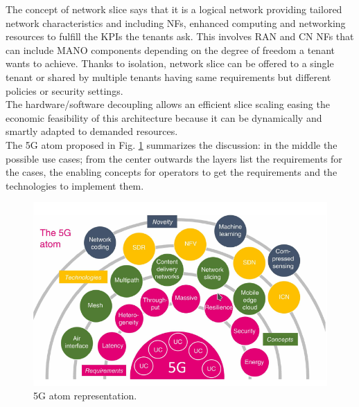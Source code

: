 \documentclass[a4paper,12pt]{report} %
\begin{document}
The concept of network slice says that it is a logical network providing tailored network characteristics and including NFs, enhanced computing and networking resources to fulfill the
KPIs the tenants ask. This involves \gls{RAN} and CN NFs that can include MANO components depending on the degree of freedom a tenant wants to achieve. Thanks to isolation, network slice can be offered to a
single tenant or shared by multiple tenants having same requirements
but different policies or security settings. \\
The hardware/software decoupling allows an efficient slice scaling easing the
economic feasibility of this architecture because it can be dynamically and smartly adapted to demanded resources.\\
The 5G atom proposed in Fig. \ref{atom} summarizes the discussion: in the middle the possible use cases; from the center outwards the layers list the requirements for the cases, the enabling concepts for
operators to get the requirements and the technologies to implement them. \cite{al20185g} \cite{5GPPP}
\begin{figure}[h]
\centering
\includegraphics[scale=0.63]{pics/5g_atom.png} 
\caption{5G atom representation. \cite{marsch20185g}}
\label{atom}
\end{figure}
\end{document}
